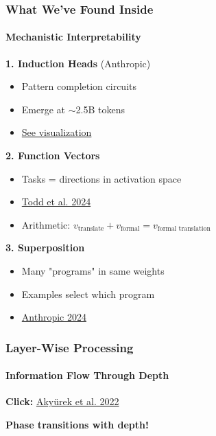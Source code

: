 \documentclass[10pt,aspectratio=169]{beamer}
\begin{document}
\begin{frame}
\frametitle{What We've Found Inside}
\framesubtitle{Mechanistic Interpretability}

\textbf{1. Induction Heads} (Anthropic)
\begin{itemize}
    \item Pattern completion circuits
    \item Emerge at $\sim$2.5B tokens
    \item \href{run:./papers/transformer_circuits_monosemantic_2023.md}{\color{blue}See visualization}
\end{itemize}

\vspace{0.3cm}
\textbf{2. Function Vectors} 
\begin{itemize}
    \item Tasks = directions in activation space
    \item \href{run:./papers/2310.15213_function_vectors.pdf}{\color{blue}Todd et al. 2024}
    \item Arithmetic: $v_{\text{translate}} + v_{\text{formal}} = v_{\text{formal translation}}$
\end{itemize}

\vspace{0.3cm}
\textbf{3. Superposition}
\begin{itemize}
    \item Many "programs" in same weights
    \item Examples select which program
    \item \href{run:./papers/transformer_circuits_scaling_2024.md}{\color{blue}Anthropic 2024}
\end{itemize}
\end{frame}

\begin{frame}
\frametitle{Layer-Wise Processing}
\framesubtitle{Information Flow Through Depth}

\begin{center}
\Large
\textbf{Click:} \href{run:./papers/2211.15661_learning_algorithm.pdf}{\color{blue}Akyürek et al. 2022}
\end{center}

\vspace{0.5cm}

\begin{center}
\end{center}

\textbf{Phase transitions with depth!}
\end{frame}
\end{document}
